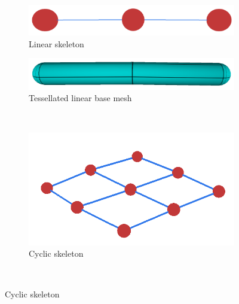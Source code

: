 \begin{figure}[h]
        \centering
        \begin{subfigure}[b]{0.4\textwidth}
                \includegraphics[width=\textwidth]{images/cerv_skl.png}
                \caption{Linear skeleton}
                \label{fig:lin_skl}
        \end{subfigure}%
        \qquad %
        \begin{subfigure}[b]{0.4\textwidth}
                \includegraphics[width=\textwidth]{images/cerv_mesh.png}
                \caption{Tessellated linear base mesh}
                \label{fig:lin_mesh}
        \end{subfigure}%
        \\ %
        \begin{subfigure}[b]{0.5\textwidth}
                \includegraphics[width=\textwidth]{images/cycle_skl.png}
                \caption{Cyclic skeleton}
                \label{fig:cyclic_skl}
        \end{subfigure}%
        ~ %

\end{figure}

